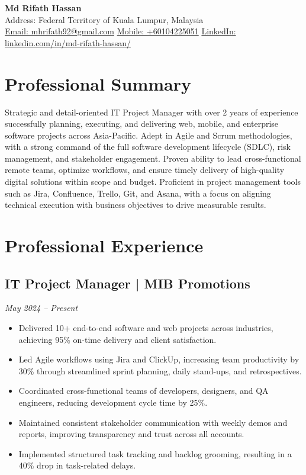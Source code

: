 \documentclass[a4paper,10pt]{article}
\begin{document}
\begin{center}
    {\LARGE \textbf{Md Rifath Hassan}} \\
    \vspace{1mm}
    Address: Federal Territory of Kuala Lumpur, Malaysia \\ 
    \href{mailto:mhrifath92@gmail.com}{Email: mhrifath92@gmail.com} 
    \href{tel:+60104225051}{Mobile: +60104225051}
    \href{https://www.linkedin.com/in/md-rifath-hassan/}{LinkedIn: linkedin.com/in/md-rifath-hassan/} \quad
    \vspace{1mm}
\end{center}

\section*{Professional Summary}
Strategic and detail-oriented IT Project Manager with over 2 years of experience successfully planning, executing, and delivering web, mobile, and enterprise software projects across Asia-Pacific. Adept in Agile and Scrum methodologies, with a strong command of the full software development lifecycle (SDLC), risk management, and stakeholder engagement. Proven ability to lead cross-functional remote teams, optimize workflows, and ensure timely delivery of high-quality digital solutions within scope and budget. Proficient in project management tools such as Jira, Confluence, Trello, Git, and Asana, with a focus on aligning technical execution with business objectives to drive measurable results.

\section*{Professional Experience}
\subsection*{IT Project Manager | MIB Promotions}
\textit{May 2024 – Present} \\

\begin{itemize}
    \item Delivered 10+ end-to-end software and web projects across industries, achieving 95\% on-time delivery and client satisfaction.
    \item Led Agile workflows using Jira and ClickUp, increasing team productivity by 30\% through streamlined sprint planning, daily stand-ups, and retrospectives.
    \item Coordinated cross-functional teams of developers, designers, and QA engineers, reducing development cycle time by 25\%.
    \item Maintained consistent stakeholder communication with weekly demos and reports, improving transparency and trust across all accounts.
    \item Implemented structured task tracking and backlog grooming, resulting in a 40\% drop in task-related delays. 
\end{itemize}
\end{document}
